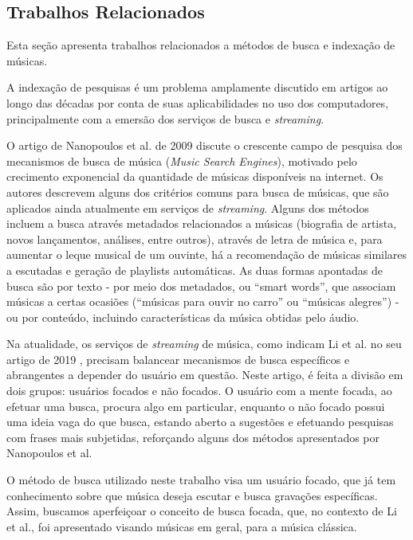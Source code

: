 \documentclass[12pt]{article}
\begin{document}
\subsection{Trabalhos Relacionados}
Esta seção apresenta trabalhos relacionados a métodos de busca e indexação de 
músicas.

A indexação de pesquisas é um problema amplamente discutido em artigos ao longo
das décadas por conta de suas aplicabilidades no uso dos computadores,
principalmente com a emersão dos serviços de busca e \emph{streaming}.

O artigo de Nanopoulos et al. de 2009 discute o crescente campo de pesquisa dos
mecanismos de busca de música (\emph{Music Search Engines}), motivado pelo
crecimento exponencial da quantidade de músicas disponíveis na internet.
Os autores descrevem alguns dos critérios comuns para busca de músicas, que são
aplicados ainda atualmente em serviços de \emph{streaming}.
Alguns dos métodos incluem a busca através metadados relacionados a músicas (biografia de
artista, novos lançamentos, análises, entre outros), através de letra de música
e, para aumentar o leque musical de um ouvinte, há a recomendação de músicas
similares a escutadas e geração de playlists automáticas.
As duas formas apontadas de busca são por texto - por meio dos metadados, ou “smart words”,
que associam músicas a certas ocasiões (``músicas para ouvir no carro'' ou ``músicas
alegres'') - ou por conteúdo, incluindo características da música obtidas pelo áudio.

Na atualidade, os serviços de \emph{streaming} de música, como indicam Li et al. no seu
artigo de 2019 \cite{LiThChToGa:19}, precisam balancear mecanismos de busca específicos
e abrangentes a depender do usuário em questão.
Neste artigo, é feita a divisão em dois grupos: usuários focados e não focados.
O usuário com a mente focada, ao efetuar uma busca, procura algo em particular,
enquanto o não focado possui uma ideia vaga do que busca, estando aberto a
sugestões e efetuando pesquisas com frases mais subjetidas, reforçando alguns
dos métodos apresentados por Nanopoulos et al.

O método de busca utilizado neste trabalho visa um usuário focado, que já tem
conhecimento sobre que música deseja escutar e busca gravações específicas.
Assim, buscamos aperfeiçoar o conceito de busca focada, que, no contexto de Li et al.,
foi apresentado visando músicas em geral, para a música clássica.
\end{document}

